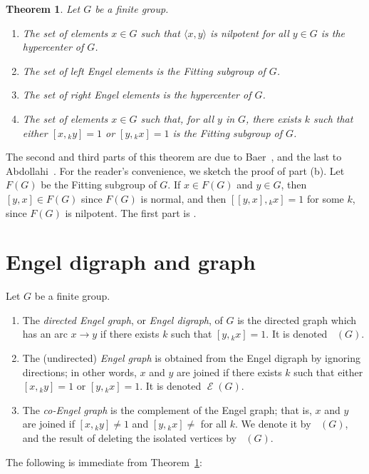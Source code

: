 \documentclass[reqno,12pt]{amsart}
\theoremstyle{plain}
\newtheorem{thm}{Theorem}[section]
\theoremstyle{definition}
\newcommand{\eng}{\mathop{\mathcal{E}}}
\newcommand{\deng}{\mathop{\overrightarrow{\mathcal{E}}}}
\newcommand{\coengall}{\mathop{\mathcal{E}_c}}
\newcommand{\coeng}{\mathop{\mathcal{E}_c^-}}
\begin{document}
\begin{thm}
Let $G$ be a finite group.
\begin{enumerate}
\item The set of elements $x\in G$ such that $\langle x,y\rangle$ is nilpotent
for all $y\in G$ is the hypercenter of $G$.
\item The set of left Engel elements is the Fitting subgroup of $G$.
\item The set of right Engel elements is the hypercenter of $G$.
\item The set of elements $x\in G$ such that, for all $y$ in $G$, there
exists $k$ such that either $[x,{}_ky]=1$ or $[y,{}_kx]=1$ is the Fitting
subgroup of $G$.
\end{enumerate}
\label{t:engelelts}
\end{thm}

The second and third parts of this theorem are due to Baer~\cite{baer}, and
the last to Abdollahi~\cite{aa}. For the reader's convenience, we
sketch the proof of part (b). Let $F(G)$ be the Fitting subgroup of $G$.
If $x\in F(G)$ and $y\in G$, then $[y,x]\in F(G)$ since $F(G)$ is normal, and
then $[[y,x],{}_kx]=1$ for some $k$, since $F(G)$ is nilpotent. The first 
part is \cite[Theorem 11.4]{Cameron2022}.

\section{Engel digraph and graph}

Let $G$ be a finite group.
\begin{enumerate}
\item The \emph{directed Engel graph}, or \emph{Engel digraph}, of $G$ is
the directed graph which has an arc $x\to y$ if there exists $k$ such that
$[y,{}_kx]=1$. It is denoted $\deng(G)$.
\item The (undirected) \emph{Engel graph} is obtained from the Engel digraph
by ignoring directions; in other words, $x$ and $y$ are joined if there exists
$k$ such that either $[x,{}_ky]=1$ or $[y,{}_kx]=1$. It is denoted
$\eng(G)$.
\item The \emph{co-Engel graph} is the complement of the Engel graph; that is,
$x$ and $y$ are joined if $[x,{}_ky]\ne1$ and $[y,{}_kx]\ne$ for all $k$.
We denote it by $\coengall(G)$, and the result of deleting the isolated
vertices by $\coeng(G)$.
\end{enumerate}

The following is immediate from Theorem~\ref{t:engelelts}:
\end{document}
